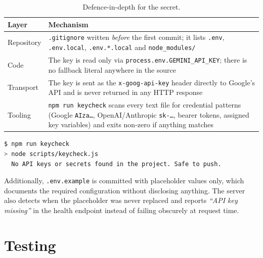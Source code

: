 \documentclass[11pt,a4paper]{article}
\begin{document}
\begin{table}[h]
\centering
\caption{Defence-in-depth for the secret.}
\begin{tabular}{@{}lp{9cm}@{}}
\toprule
\textbf{Layer} & \textbf{Mechanism} \\
\midrule
Repository   & \texttt{.gitignore} written \emph{before} the first commit; it lists \texttt{.env},
               \texttt{.env.local}, \texttt{.env.*.local} and \texttt{node\_modules/} \\
Code         & The key is read only via \texttt{process.env.GEMINI\_API\_KEY}; there is no
               fallback literal anywhere in the source \\
Transport    & The key is sent as the \texttt{x-goog-api-key} header directly to Google's API and
               is never returned in any HTTP response \\
Tooling      & \texttt{npm run keycheck} scans every text file for credential patterns
               (Google \texttt{AIza…}, OpenAI/Anthropic \texttt{sk-…}, bearer tokens, assigned key
               variables) and exits non-zero if anything matches \\
\bottomrule
\end{tabular}
\end{table}

\begin{lstlisting}[language=bash,caption={Verifying the repository before every push.}]
$ npm run keycheck
> node scripts/keycheck.js
  No API keys or secrets found in the project. Safe to push.
\end{lstlisting}

Additionally, \texttt{.env.example} is committed with placeholder values only, which documents
the required configuration without disclosing anything. The server also detects when the
placeholder was never replaced and reports \emph{``API key missing''} in the health endpoint
instead of failing obscurely at request time.

\section{Testing}
\end{document}
